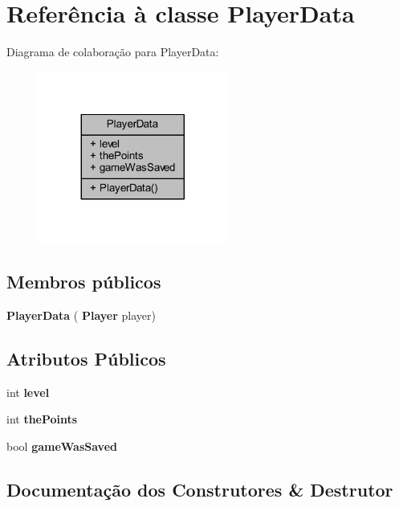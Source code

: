 \section{Referência à classe Player\+Data}
\label{class_player_data}


Diagrama de colaboração para Player\+Data\+:
\nopagebreak
\begin{figure}[H]
\begin{center}
\leavevmode
\includegraphics[width=176pt]{class_player_data__coll__graph}
\end{center}
\end{figure}
\subsection*{Membros públicos}
\begin{DoxyCompactItemize}
\item 
\textbf{ Player\+Data} (\textbf{ Player} player)
\end{DoxyCompactItemize}
\subsection*{Atributos Públicos}
\begin{DoxyCompactItemize}
\item 
int \textbf{ level}
\item 
int \textbf{ the\+Points}
\item 
bool \textbf{ game\+Was\+Saved}
\end{DoxyCompactItemize}


\subsection{Documentação dos Construtores \& Destrutor}
\mbox{\label{class_player_data_a47929ba96be8ecea1989cd8587c14214}} 

